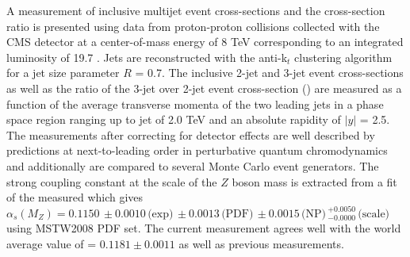 A measurement of inclusive multijet event cross-sections and the cross-section ratio is presented using data from proton-proton collisions collected with the CMS detector at a center-of-mass energy of 8 TeV corresponding to an integrated luminosity of 19.7 \fbinv. Jets are reconstructed with the anti-k$_t$ clustering algorithm for a jet size parameter $R$ = 0.7. The inclusive 2-jet and 3-jet event cross-sections as well as the ratio of the 3-jet over 2-jet event cross-section (\ratio) are measured as a function of the average transverse momenta \pt of the two leading jets in a phase space region ranging up to jet \pt of 2.0 TeV and an absolute rapidity of $|y|$ = 2.5. The measurements after correcting for detector effects are well described by predictions at next-to-leading order in perturbative quantum chromodynamics and additionally are compared to several Monte Carlo event generators. The strong coupling constant at the scale of the $Z$ boson mass is extracted from a fit of the measured \ratio which gives $\alpha_s(M_Z) = 0.1150\,\pm0.0010\,\textrm{(exp)}\,\pm0.0013\,\textrm{(PDF)}\, \pm0.0015\,\textrm{(NP)}\,^{+0.0050}_{-0.0000}\,\textrm{(scale)}$ using MSTW2008 PDF set. The current measurement agrees well with the world average value of \alpsmz = $0.1181 \pm 0.0011$ as well as previous measurements.
